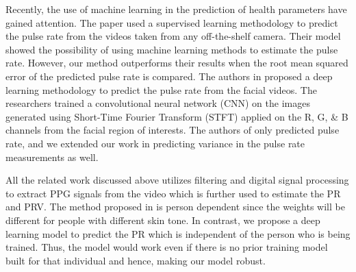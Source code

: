 Recently, the use of machine learning in the prediction of health parameters have gained attention. The paper \cite{osman2015supervised} used a supervised learning methodology to predict the pulse rate from the videos taken from any off-the-shelf camera. Their model showed the possibility of using machine learning methods to estimate the pulse rate. However, our method outperforms their results when the root mean squared error of the predicted pulse rate is compared. The authors in \cite{hsu2017deep} proposed a deep learning methodology to predict the pulse rate from the facial videos. The researchers trained a convolutional neural network (CNN) on the images generated using Short-Time Fourier Transform (STFT) applied on the R, G, \& B channels from the facial region of interests.
The authors of \cite{osman2015supervised, hsu2017deep} only predicted pulse rate, and we extended our work in predicting variance in the pulse rate measurements as well.

All the related work discussed above utilizes filtering and digital signal processing to extract PPG signals from the video which is further used to estimate the PR and PRV.  %
The method proposed in \cite{kumar2015distanceppg} is person dependent since the weights will be different for people with different skin tone. In contrast, we propose a deep learning model to predict the PR which is independent of the person who is being trained. Thus, the model would work even if there is no prior training model built for that individual and hence, making our model robust. 

%